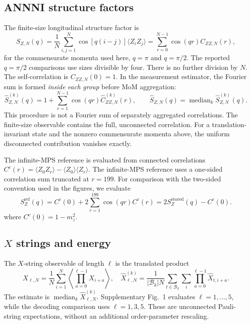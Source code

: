 \documentclass[11pt,a4paper]{article}
\newcommand{\TBD}[1]{\textcolor{red!70!black}{\textsf{[TBD: #1]}}}
\newcommand{\subhead}[1]{\subsection*{#1}}
\begin{document}
\subhead{ANNNI structure factors}
The finite-size longitudinal structure factor is
\begin{equation}
S_{Z,N}(q)=\frac1N\sum_{i,j=1}^{N}
\cos[q(i-j)]\langle Z_iZ_j\rangle
=\sum_{r=0}^{N-1}\cos(qr)C_{ZZ,N}(r),
\label{supp:eq:annni_sf}
\end{equation}
for the commensurate momenta used here, $q=\pi$ and $q=\pi/2$.
The reported $q=\pi/2$ comparisons use sizes divisible by four.
There is no further division by $N$. The self-correlation is
$C_{ZZ,N}(0)=1$. In the measurement estimator, the Fourier sum is formed
\emph{inside each group} before MoM aggregation:
\begin{equation}
\widehat{S}^{(k)}_{Z,N}(q)
=1+\sum_{r=1}^{N-1}\cos(qr)\widehat{C}^{(k)}_{ZZ,N}(r),
\qquad
\widehat{S}_{Z,N}(q)=\operatorname{median}_k
\widehat{S}^{(k)}_{Z,N}(q).
\label{supp:eq:annni_sf_estimator}
\end{equation}
This procedure is not a Fourier sum of separately aggregated correlations.
The finite-size observable contains the full, unconnected correlation.
For a translation-invariant state and the nonzero commensurate momenta
above, the uniform disconnected contribution vanishes exactly.

The infinite-MPS reference is evaluated from connected correlations
$C^c(r)=\langle Z_0Z_r\rangle-\langle Z_0\rangle\langle Z_r\rangle$.
The infinite-MPS reference uses a one-sided correlation sum truncated at \(r=199\). For comparison with the two-sided convention used in the figures, we evaluate
\begin{equation}
S^{\mathrm{ref}}_Z(q)
=C^c(0)+2\sum_{r=1}^{199}\cos(qr)C^c(r)
=2S^{\mathrm{stored}}_Z(q)-C^c(0).
\label{supp:eq:sf_reference}
\end{equation}
where $C^c(0)=1-m_z^2$.

\subhead{$X$ strings and energy}
The $X$-string observable of length $\ell$ is the translated product
\begin{equation}
X_{\ell,N}=\frac1N\sum_{i=1}^{N}
\left\langle\prod_{a=0}^{\ell-1}X_{i+a}\right\rangle,
\quad
\widehat{X}^{(k)}_{\ell,N}
=\frac{1}{|\mathcal{B}_k|N}
\sum_{t\in\mathcal{B}_k}\sum_i
\prod_{a=0}^{\ell-1}\widehat{X}_{t,i+a}.
\label{supp:eq:x_string}
\end{equation}
The estimate is $\operatorname{median}_k\widehat{X}^{(k)}_{\ell,N}$.
Supplementary Fig.~1 evaluates $\ell=1,\ldots,5$, while the decoding
comparison uses $\ell=1,3,5$. These are unconnected Pauli-string
expectations, without an additional order-parameter rescaling.
\end{document}
